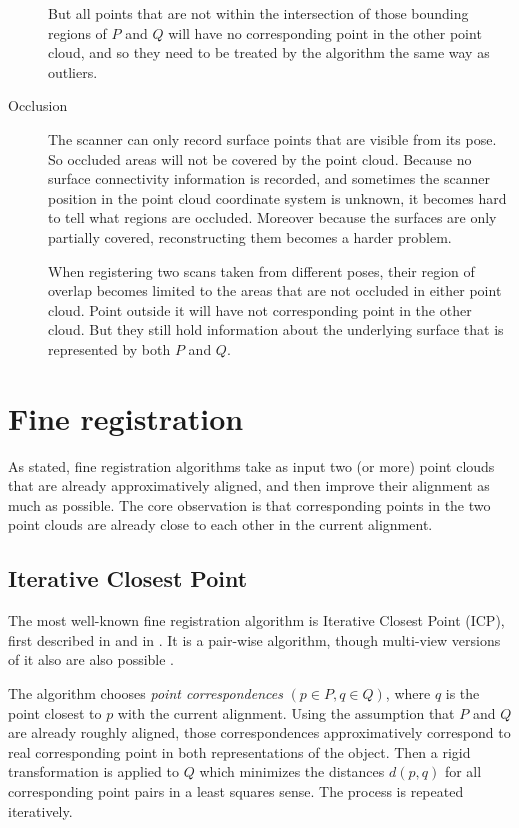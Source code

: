 \begin{description}
But all points that are not within the intersection of those bounding regions of $P$ and $Q$ will have no corresponding point in the other point cloud, and so they need to be treated by the algorithm the same way as outliers.

\item[Occlusion] The scanner can only record surface points that are visible from its pose. So occluded areas will not be covered by the point cloud. Because no surface connectivity information is recorded, and sometimes the scanner position in the point cloud coordinate system is unknown, it becomes hard to tell what regions are occluded. Moreover because the surfaces are only partially covered, reconstructing them becomes a harder problem.

When registering two scans taken from different poses, their region of overlap becomes limited to the areas that are not occluded in either point cloud. Point outside it will have not corresponding point in the other cloud. But they still hold information about the underlying surface that is represented by both $P$ and $Q$.
\end{description} 


\section{Fine registration}
As stated, fine registration algorithms take as input two (or more) point clouds that are already approximatively aligned, and then improve their alignment as much as possible. The core observation is that corresponding points in the two point clouds are already close to each other in the current alignment.

\subsection{Iterative Closest Point} \label{sec:icp}
The most well-known fine registration algorithm is Iterative Closest Point (ICP), first described in \cite{Besl1992} and in \cite{Chen1991}. It is a pair-wise algorithm, though multi-view versions of it also are also possible \cite{Told2010}.

The algorithm chooses \emph{point correspondences} $(p \in P, q \in Q)$, where $q$ is the point closest to $p$ with the current alignment. Using the assumption that $P$ and $Q$ are already roughly aligned, those correspondences approximatively correspond to real corresponding point in both representations of the object. Then a rigid transformation is applied to $Q$ which minimizes the distances $d(p, q)$ for all corresponding point pairs in a least squares sense. The process is repeated iteratively.

